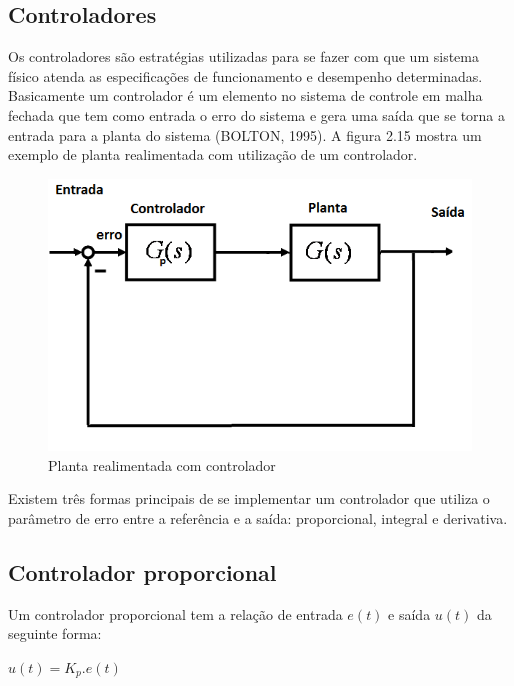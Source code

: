 \subsection{Controladores}
Os controladores são estratégias utilizadas para se fazer com que um sistema físico atenda as especificações de funcionamento e desempenho determinadas.  Basicamente um controlador é um elemento no sistema de controle em malha fechada que tem como entrada o erro do sistema e gera uma saída que se torna a entrada para a planta do sistema (BOLTON, 1995). A figura 2.15 mostra um exemplo de planta realimentada com utilização de um controlador.

\begin{figure}[!htb]

\center

\includegraphics[width=12cm]{imagens/planta_realimentada.png}

\label{Planta realimentada com controlador}

\caption{Planta realimentada com controlador}

\end{figure}

Existem três formas principais de se implementar um controlador que utiliza o parâmetro de erro entre a referência e a saída: proporcional, integral e derivativa.

\subsection{Controlador proporcional}

Um controlador proporcional tem a relação de entrada $e(t)$ e saída $u(t)$ da seguinte forma:

\begin{center}
$u(t) = K_p.e(t)$
\end{center}

